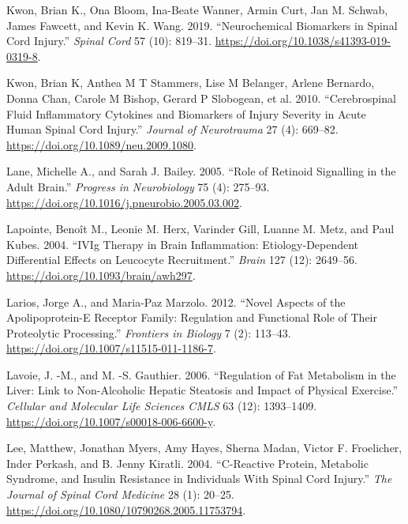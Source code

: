 \documentclass[9pt,lineno]{elife}
\newlength{\cslhangindent}
\newlength{\cslentryspacingunit} %
\newenvironment{CSLReferences}[2] %
 {%
  \setlength{\parindent}{0pt}
  \ifodd #1
  \let\oldpar\par
  \def\par{\hangindent=\cslhangindent\oldpar}
  \fi
  \setlength{\parskip}{#2\cslentryspacingunit}
 }%
 {}
\begin{document}
\begin{CSLReferences}{1}{0}
\leavevmode{}%
Kwon, Brian K., Ona Bloom, Ina-Beate Wanner, Armin Curt, Jan M. Schwab, James Fawcett, and Kevin K. Wang. 2019. {``Neurochemical Biomarkers in Spinal Cord Injury.''} \emph{Spinal Cord} 57 (10): 819--31. \url{https://doi.org/10.1038/s41393-019-0319-8}.

\leavevmode{}%
Kwon, Brian K, Anthea M T Stammers, Lise M Belanger, Arlene Bernardo, Donna Chan, Carole M Bishop, Gerard P Slobogean, et al. 2010. {``Cerebrospinal Fluid Inflammatory Cytokines and Biomarkers of Injury Severity in Acute Human Spinal Cord Injury.''} \emph{Journal of Neurotrauma} 27 (4): 669--82. \url{https://doi.org/10.1089/neu.2009.1080}.

\leavevmode{}%
Lane, Michelle A., and Sarah J. Bailey. 2005. {``Role of Retinoid Signalling in the Adult Brain.''} \emph{Progress in Neurobiology} 75 (4): 275--93. \url{https://doi.org/10.1016/j.pneurobio.2005.03.002}.

\leavevmode{}%
Lapointe, Benoît M., Leonie M. Herx, Varinder Gill, Luanne M. Metz, and Paul Kubes. 2004. {``{IVIg} Therapy in Brain Inflammation: Etiology-Dependent Differential Effects on Leucocyte Recruitment.''} \emph{Brain} 127 (12): 2649--56. \url{https://doi.org/10.1093/brain/awh297}.

\leavevmode{}%
Larios, Jorge A., and Maria-Paz Marzolo. 2012. {``Novel Aspects of the Apolipoprotein-{E} Receptor Family: Regulation and Functional Role of Their Proteolytic Processing.''} \emph{Frontiers in Biology} 7 (2): 113--43. \url{https://doi.org/10.1007/s11515-011-1186-7}.

\leavevmode{}%
Lavoie, J. -M., and M. -S. Gauthier. 2006. {``Regulation of Fat Metabolism in the Liver: Link to Non-Alcoholic Hepatic Steatosis and Impact of Physical Exercise.''} \emph{Cellular and Molecular Life Sciences CMLS} 63 (12): 1393--1409. \url{https://doi.org/10.1007/s00018-006-6600-y}.

\leavevmode{}%
Lee, Matthew, Jonathan Myers, Amy Hayes, Sherna Madan, Victor F. Froelicher, Inder Perkash, and B. Jenny Kiratli. 2004. {``C-{Reactive Protein}, {Metabolic Syndrome}, and {Insulin Resistance} in {Individuals With Spinal Cord Injury}.''} \emph{The Journal of Spinal Cord Medicine} 28 (1): 20--25. \url{https://doi.org/10.1080/10790268.2005.11753794}.


\end{CSLReferences}
\end{document}
